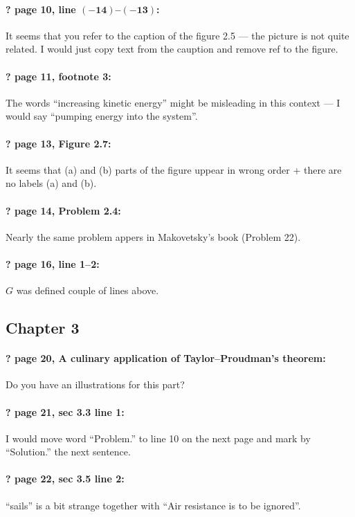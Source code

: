 \documentclass[twoside]{article}
\begin{document}
\paragraph{? page 10, line $\bm{(-14)}$--$\bm{(-13)}$:} It seems that you refer to the caption of the figure 2.5 --- the picture is not quite related. I would just copy text from the cauption and remove ref to the figure.

\paragraph{? page 11, footnote 3:} The words ``increasing kinetic energy'' might be misleading in this context --- I would say ``pumping energy into the system''.

\paragraph{? page 13, Figure 2.7:} It seems that (a) and (b) parts of the figure uppear in wrong order + there are no labels (a) and (b).

\paragraph{? page 14, Problem 2.4:} Nearly the same problem appers in Makovetsky’s book (Problem 22).

\paragraph{? page 16, line 1--2:} $G$ was defined couple of lines above.

\subsection*{Chapter 3}

\paragraph{? page 20, A culinary application of Taylor--Proudman’s theorem:} Do you have an illustrations for this part?

\paragraph{? page 21, sec 3.3 line 1:} I would move word ``Problem.'' to line 10 on the next page and  mark by ``Solution.'' the next sentence.

\paragraph{? page 22, sec 3.5 line 2:} ``sails'' is a bit strange together with ``Air resistance
is to be ignored''.
\end{document}
